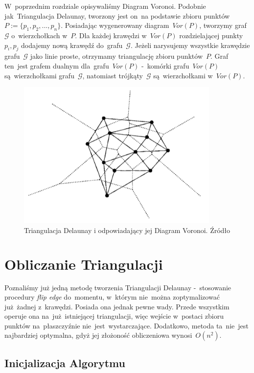 \documentclass[skorowidz,autorrok,backref,xodstep,oswiadczenie]{wmimgr}
\begin{document}
W~poprzednim rozdziale opisywaliśmy Diagram Voronoi. Podobnie jak~Triangulacja Delaunay, tworzony jest on~na podstawie zbioru punktów~$P:=\{ p_{1},p_{2},...,p_{n} \}$. Posiadając wygenerowany diagram~$Vor(P)$, tworzymy graf~$\mathcal{G}$ o~wierzchołkach w~$P$. Dla każdej krawędzi w~$Vor(P)$ rozdzielającej punkty $p_{i}, p_{j}$ dodajemy nową krawędź do~grafu~$\mathcal{G}$. Jeżeli narysujemy wszystkie krawędzie grafu~$\mathcal{G}$ jako linie proste, otrzymamy triangulację zbioru punktów~$P$. Graf ten~jest grafem dualnym dla~grafu~$Vor(P)$ -~komórki grafu~$Vor(P)$ są~wierzchołkami grafu~$\mathcal{G}$, natomiast trójkąty~$\mathcal{G}$ są~wierzchołkami w~$Vor(P)$.


\begin{figure}[ht!]
\centering
\includegraphics[width=100mm]{images/dualizm.png}
\caption{Triangulacja Delaunay i odpowiadający jej Diagram Voronoi. Źródło \cite{geometria}}
\label{duality}
\end{figure}

\section{Obliczanie Triangulacji}

Poznaliśmy już jedną metodę tworzenia Triangulacji Delaunay -~stosowanie procedury \emph{flip edge} do~momentu, w~którym nie~można zoptymalizować już~żadnej z~krawędzi. Posiada ona jednak pewne wady. Przede wszystkim operuje ona na~już~istniejącej triangulacji, więc wejście w~postaci zbioru punktów na~płaszczyźnie nie~jest~wystarczające. Dodatkowo, metoda ta~nie~jest najbardziej optymalna, gdyż jej złożoność obliczeniowa wynosi~$O(n^2)$.

\subsection{Inicjalizacja Algorytmu}
\end{document}
